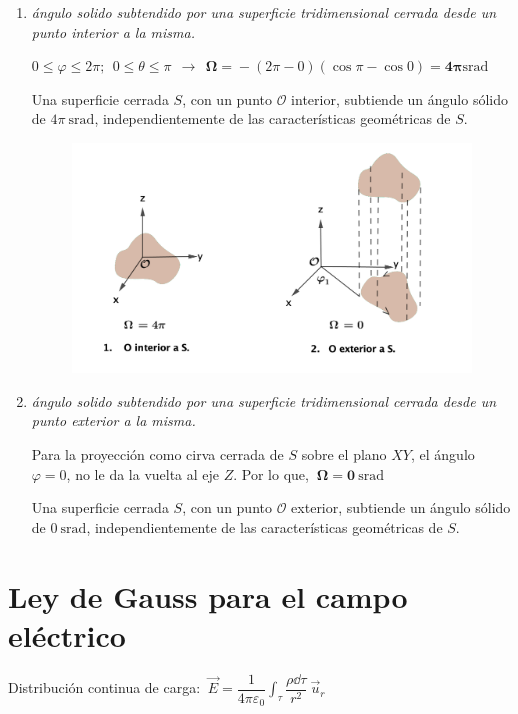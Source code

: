 \begin{enumerate}
\item 	 \emph{ángulo solido subtendido por una superficie tridimensional cerrada desde un punto interior a la misma.}

$0\leq \varphi\leq 2\pi;\ \  0\leq \theta\leq \pi \ \ \to \ \  \boldsymbol{\Omega=}-(2\pi-0)(\cos \pi -\cos 0) \boldsymbol{= 4\pi}  \mathrm{srad}$

Una superficie cerrada $S$, con un punto $\mathcal O$ interior, subtiende un ángulo sólido de $4\pi\ \mathrm{srad}$, independientemente de las características geométricas de $S$.

\begin{figure}[H]
	\centering
	\includegraphics[width=.9\textwidth]{imagenes/imagenes23/T23IM05.png}
\end{figure}

\item  \emph{ángulo solido subtendido por una superficie tridimensional cerrada desde un punto exterior a la misma.}

Para la proyección como cirva cerrada de $S$ sobre el plano $XY$, el ángulo $\varphi=0$, no le da la vuelta al eje $Z$. Por lo que, $\ \boldsymbol{\Omega =0 \ \mathrm{srad}}$ 

Una superficie cerrada $S$, con un punto $\mathcal O$ exterior, subtiende un ángulo sólido de $0\ \mathrm{srad}$, independientemente de las características geométricas de $S$.
\end{enumerate}

\section{Ley de Gauss para el campo eléctrico}

Distribución continua de carga: $\displaystyle \ \vec E=\dfrac 1{4\pi \varepsilon_0} \int_\tau \dfrac{\rho \dd \tau}{r^2} \ \vec u_r$

